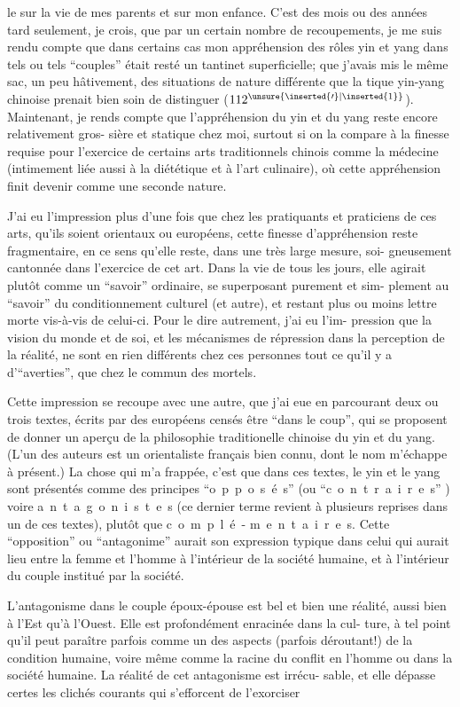 le sur la vie de mes parents et sur mon enfance. C'est des mois ou des années 
tard seulement, je crois, que par un certain nombre de recoupements, je me suis
rendu compte que dans certains cas mon appréhension des rôles yin et yang dans
tels ou tels ``couples'' était resté un tantinet superficielle; que j'avais mis 
le même sac, un peu hâtivement, des situations de nature différente que la 
tique yin-yang chinoise prenait bien soin de distinguer ($112^{\unsure{\inserted{\prime}|\inserted{1}}}$). Maintenant, je 
rends compte que l'appréhension du yin et du yang reste encore relativement gros-
sière et statique chez moi, surtout si on la compare à la finesse requise pour
l'exercice de certains arts traditionnels chinois comme la médecine (intimement
liée aussi à la diététique et à l'art culinaire), où cette appréhension finit 
devenir comme une seconde nature.

J'ai eu l'impression plus d'une fois que chez les pratiquants et praticiens
de ces arts, qu'ils soient orientaux ou européens, cette finesse d'appréhension
reste fragmentaire, en ce sens qu'elle reste, dans une très large mesure, soi-
gneusement cantonnée dans l'exercice de cet art. Dans la vie de tous les jours,
elle agirait plutôt comme un ``savoir'' ordinaire, se superposant purement et sim-
plement au ``savoir'' du conditionnement culturel (et autre), et restant plus ou
moins lettre morte vis-à-vis de celui-ci. Pour le dire autrement, j'ai eu l'im-
pression que la vision du monde et de soi, et les mécanismes de répression dans
la perception de la réalité, ne sont en rien différents chez ces personnes tout
ce qu'il y a d'``averties'', que chez le commun des mortels.

Cette impression se recoupe avec une autre, que j'ai eue en parcourant deux
ou trois textes, écrits par des européens censés être ``dans le coup'', qui se
proposent de donner un aperçu de la philosophie traditionelle chinoise du yin
et du yang. (L'un des auteurs est un orientaliste français bien connu, dont
le nom m'échappe à présent.) La chose qui m'a frappée, c'est que dans ces textes,
le yin et le yang sont présentés comme des principes ``\mbox{o p p o s é s}'' (ou
``\mbox{c o n t r a i r e s}'' ) voire \mbox{a n t a g o n i s t e s} (ce dernier terme
revient à plusieurs reprises dans un de ces textes), plutôt que \mbox{c o m p l é -}
\mbox{m e n t a i r e s}. Cette ``opposition'' ou ``antagonime'' aurait son expression
typique dans celui qui aurait lieu entre la femme et l'homme à l'intérieur de
la société humaine, et à l'intérieur du couple institué par la société.

L'antagonisme dans le couple époux-épouse est bel et bien une réalité,
aussi bien à l'Est qu'à l'Ouest. Elle est profondément enracinée dans la cul-
ture, à tel point qu'il peut paraître parfois comme un des aspects (parfois
déroutant!) de la condition humaine, voire même comme la racine du conflit en
l'homme ou dans la société humaine. La réalité de cet antagonisme est irrécu-
sable, et elle dépasse certes les clichés courants qui s'efforcent de l'exorciser
